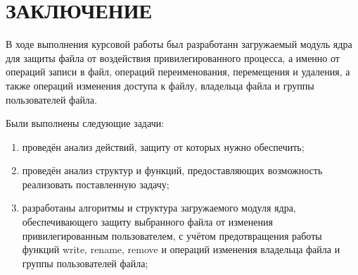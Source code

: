 \section*{\large ЗАКЛЮЧЕНИЕ}

В  ходе  выполнения  курсовой работы  был разработанн загружаемый модуль ядра для  защиты файла от воздействия привилегированного процесса, а именно от операций записи в файл, операций переименования, перемещения и удаления, а также операций изменения доступа к файлу, владельца файла и группы пользователей файла.

Были выполнены следующие задачи:

\begin{enumerate}[label=\arabic*)]
	\item проведён анализ действий, защиту от которых нужно обеспечить;
	\item проведён анализ структур и функций, предоставляющих возможность реализовать поставленную задачу;
	\item разработаны алгоритмы и структура загружаемого модуля ядра, обеспечивающего защиту выбранного файла от  изменения привилегированным пользователем, с учётом предотвращения работы функций write, rename, remove и операций изменения владельца файла и группы пользователей файла;
\end{enumerate}


\pagebreak